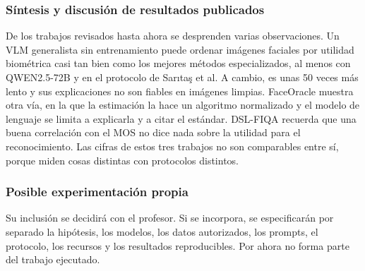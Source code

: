 \subsubsection{Síntesis y discusión de resultados publicados}
De los trabajos revisados hasta ahora se desprenden varias observaciones. Un VLM generalista sin entrenamiento puede ordenar imágenes faciales por utilidad biométrica casi tan bien como los mejores métodos especializados, al menos con QWEN2.5-72B y en el protocolo de Sarıtaş et al. A cambio, es unas 50 veces más lento y sus explicaciones no son fiables en imágenes limpias. FaceOracle muestra otra vía, en la que la estimación la hace un algoritmo normalizado y el modelo de lenguaje se limita a explicarla y a citar el estándar. DSL-FIQA recuerda que una buena correlación con el MOS no dice nada sobre la utilidad para el reconocimiento. Las cifras de estos tres trabajos no son comparables entre sí, porque miden cosas distintas con protocolos distintos.

\subsubsection{Posible experimentación propia}
Su inclusión se decidirá con el profesor. Si se incorpora, se especificarán por separado la hipótesis, los modelos, los datos autorizados, los prompts, el protocolo, los recursos y los resultados reproducibles. Por ahora no forma parte del trabajo ejecutado.
